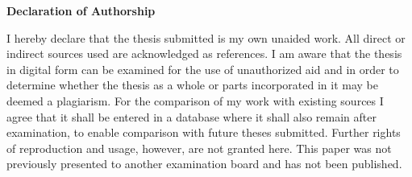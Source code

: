 \documentclass[parskip=half-,parskip=relative]{scrartcl}
\begin{document}
\rhead{\title}

\maketitle

\textbf{Declaration of Authorship}

I hereby declare that the thesis submitted is my own unaided work. All
direct or indirect sources used are acknowledged as references.  I am
aware that the thesis in digital form can be examined for the use of
unauthorized aid and in order to determine whether the thesis as a
whole or parts incorporated in it may be deemed a plagiarism. For the
comparison of my work with existing sources I agree that it shall be
entered in a database where it shall also remain after examination, to
enable comparison with future theses submitted. Further rights of
reproduction and usage, however, are not granted here.  This paper was
not previously presented to another examination board and has not been
published.

\thispagestyle{empty}

\newpage

\tableofcontents

\linespread{1.25}


\end{document}
